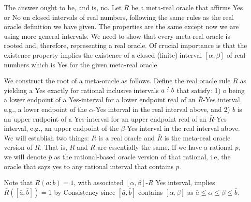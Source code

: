 \documentclass[12pt]{article}
\begin{document}
The answer ought to be, and is, no. Let $\bar{R}$ be a meta-real oracle that affirms Yes or No on closed intervals of real numbers, following the same rules as the real oracle definition we have given. The properties are the same except now we are using more general intervals. We need to show that every meta-real oracle is rooted and, therefore, representing a real oracle. Of crucial importance is that the existence property implies the existence of a closed (finite) interval $[\alpha, \beta]$ of real numbers which is Yes for the given meta-real oracle. 

We construct the root of a meta-oracle as follows. Define the real oracle rule $R$ as yielding a Yes exactly for rational inclusive intervals $a\lte b$ that satisfy: 1) $a$ being a lower endpoint of a Yes-interval for a lower endpoint real of an $\bar{R}$-Yes interval, e.g., a lower endpoint of the $\alpha$-Yes interval in the real interval above,  and 2) $b$ is an upper endpoint of a Yes-interval for an upper endpoint real of an $\bar{R}$-Yes interval, e.g., an upper endpoint of the $\beta$-Yes interval in the real interval above. We will establish two things: $R$ is a real oracle and $\bar{R}$ is the meta-real oracle version of $R$. That is, $R$ and $\bar{R}$ are essentially the same. If we have a rational $p$, we will denote $\bar{p}$ as the rational-based oracle version of that rational, i.e, the oracle that says yes to any rational interval that contains $p$. 

Note that $R(a:b) = 1$, with associated $[\alpha, \beta]$-$\bar{R}$ Yes interval, implies $\bar{R}([\bar{a}, \bar{b}]) = 1$ by Consistency since $[\bar{a}, \bar{b}]$ contains $[\alpha, \beta]$ as $\bar{a} \leq \alpha \leq \beta \leq \bar{b}$.
\end{document}
